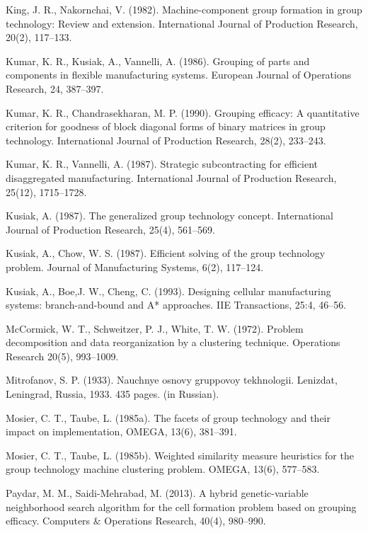 \documentclass[citeauthoryear]{llncs}
\begin{document}
\begin{thebibliography}{99}
 King, J. R., Nakornchai, V. (1982). Machine-component group formation in group technology: Review and extension. International Journal of Production Research, 20(2), 117--133.

 Kumar, K. R., Kusiak, A., Vannelli, A. (1986). Grouping of parts and components in flexible manufacturing systems. European Journal of Operations Research, 24, 387--397.

 Kumar, K. R., Chandrasekharan, M. P. (1990). Grouping efficacy: A quantitative criterion for goodness of block diagonal forms of binary matrices in group technology. International Journal of Production Research, 28(2), 233--243.

 Kumar, K. R., Vannelli, A. (1987). Strategic subcontracting for efficient disaggregated manufacturing. International Journal of Production Research, 25(12), 1715--1728.

 Kusiak, A. (1987). The generalized group technology concept. International Journal of Production Research, 25(4), 561--569.

 Kusiak, A., Chow, W. S. (1987). Efficient solving of the group technology problem. Journal of Manufacturing Systems, 6(2), 117--124.
    
 Kusiak, A., Boe,J. W., Cheng, C. (1993). Designing cellular manufacturing systems: branch-and-bound and A* approaches. IIE Transactions, 25:4, 46--56.

 McCormick, W. T., Schweitzer, P. J., White, T. W. (1972). Problem decomposition and data reorganization by a clustering technique. Operations Research 20(5), 993--1009.

 Mitrofanov, S. P. (1933). Nauchnye osnovy gruppovoy tekhnologii. Lenizdat, Leningrad, Russia, 1933. 435 pages. (in Russian).

 Mosier, C. T., Taube, L. (1985a). The facets of group technology and their impact on implementation, OMEGA, 13(6), 381--391.
    
 Mosier, C. T., Taube, L. (1985b). Weighted similarity measure heuristics for the group technology machine clustering problem. OMEGA, 13(6), 577--583.

 Paydar, M. M., Saidi-Mehrabad, M. (2013). A hybrid genetic-variable neighborhood search algorithm for the cell formation problem based on grouping efficacy. Computers \& Operations Research, 40(4), 980--990.


\end{thebibliography}
\end{document}
